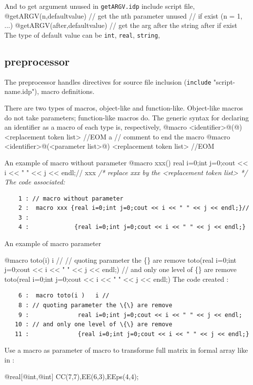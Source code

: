 \documentclass[a4paper,twoside,12pt]{book}
\begin{document}
And to get argument unused in \texttt{getARGV.idp} include script file, 
\bFF
@getARGV(n,defaultvalue) // get the nth parameter unused 
// if exist (n = 1, ...)
@getARGV(after,defaultvalue) // get the arg after the string after if exist
\eFF
The type of default value can be \texttt{int}, \texttt{real}, \texttt{string},
\subsection{preprocessor}
The preprocessor handles directives for source file inclusion (\texttt{include} "script-name.idp"), macro definitions.

There are two types of macros, object-like and function-like. Object-like macros do not take parameters; function-like macros do. The generic syntax for declaring an identifier as a macro of each type is, respectively,
\bFF
@macro <identifier>@(@)  <replacement token list>  //EOM  a // comment  to end the macro
@macro <identifier>@(<parameter list>@) <replacement token list> //EOM 
\eFF

An example of macro without parameter 
\bFF
@macro xxx() {real i=0;int j=0;cout << i << " " << j << endl;}//
xxx \it/* replace xxx by the <replacement token list> */
\eFF
 The \freefempp code associated: 
\begin{verbatim}
    1 : // macro without parameter 
    2 :  macro xxx {real i=0;int j=0;cout << i << " " << j << endl;}//
    3 : 
    4 :             {real i=0;int j=0;cout << i << " " << j << endl;}
\end{verbatim}

An example of macro parameter 

\bFF
@macro toto(i) i //
// quoting parameter the \{\} are remove
toto({real i=0;int j=0;cout << i << " " << j << endl;})
// and only one level of \{\} are remove 
toto({{real i=0;int j=0;cout << i << " " << j << endl;}})
\eFF
 The \freefempp code created :
\begin{verbatim}
    6 :  macro toto(i )   i // 
    8 : // quoting parameter the \{\} are remove
    9 :              real i=0;int j=0;cout << i << " " << j << endl; 
   10 : // and only one level of \{\} are remove 
   11 :              {real i=0;int j=0;cout << i << " " << j << endl;} 
\end{verbatim}

Use a  macro as parameter of macro 
to transforme full matrix in formal array like in :

\bFF
@real[@int,@int] CC(7,7),EE(6,3),EEps(4,4);
\end{document}
